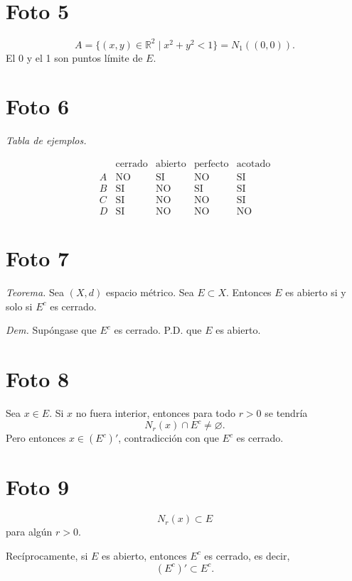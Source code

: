 \documentclass[12pt]{article}
\begin{document}
\section*{Foto 5}

\[
A=\{(x,y)\in\mathbb R^2\mid x^2+y^2<1\}=N_1((0,0)).
\]
El 0 y el 1 son puntos l\'imite de $E$.

\section*{Foto 6}

\textit{Tabla de ejemplos.}

\[
\begin{array}{c|cccc}
 & \text{cerrado} & \text{abierto} & \text{perfecto} & \text{acotado}\\
\hline
A & \text{NO} & \text{SI} & \text{NO} & \text{SI}\\
B & \text{SI} & \text{NO} & \text{SI} & \text{SI}\\
C & \text{SI} & \text{NO} & \text{NO} & \text{SI}\\
D & \text{SI} & \text{NO} & \text{NO} & \text{NO}
\end{array}
\]

\section*{Foto 7}

\textit{Teorema.}
Sea $(X,d)$ espacio m\'etrico. Sea $E\subset X$.
Entonces $E$ es abierto si y solo si $E^c$ es cerrado.

\textit{Dem.}
Sup\'ongase que $E^c$ es cerrado. P.D. que $E$ es abierto.

\section*{Foto 8}

Sea $x\in E$. Si $x$ no fuera interior, entonces para todo $r>0$ se tendr\'ia
\[
N_r(x)\cap E^c\neq\varnothing.
\]
Pero entonces $x\in (E^c)'$, contradicci\'on con que $E^c$ es cerrado.

\section*{Foto 9}

\[
N_r(x)\subset E
\]
para alg\'un $r>0$.

Rec\'iprocamente, si $E$ es abierto, entonces $E^c$ es cerrado, es decir,
\[
(E^c)'\subset E^c.
\]
\end{document}
